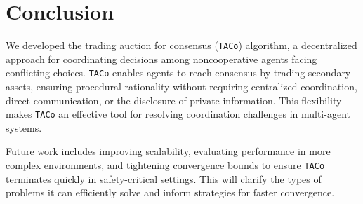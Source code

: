 \section{Conclusion}

We developed the trading auction for consensus (\texttt{TACo}) algorithm, a decentralized approach for coordinating decisions among noncooperative agents facing conflicting choices. \texttt{TACo} enables agents to reach consensus by trading secondary assets, ensuring procedural rationality without requiring centralized coordination, direct communication, or the disclosure of private information. This flexibility makes \texttt{TACo} an effective tool for resolving coordination challenges in multi-agent systems.

Future work includes improving scalability, evaluating performance in more complex environments, and tightening convergence bounds to ensure \texttt{TACo} terminates quickly in safety-critical settings. This will clarify the types of problems it can efficiently solve and inform strategies for faster convergence.

